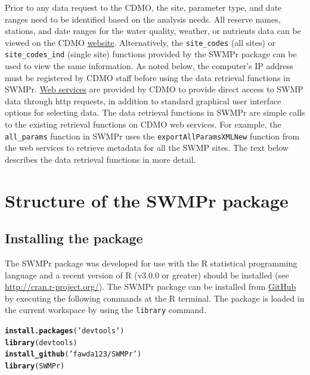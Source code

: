\documentclass[10pt,letterpaper]{article}\usepackage[]{graphicx}\usepackage[]{color}
\makeatletter
\newcommand{\hlstr}[1]{\textcolor[rgb]{0.192,0.494,0.8}{#1}}%
\newcommand{\hlstd}[1]{\textcolor[rgb]{0.345,0.345,0.345}{#1}}%
\newcommand{\hlkwd}[1]{\textcolor[rgb]{0.737,0.353,0.396}{\textbf{#1}}}%
\newenvironment{kframe}{%
 \def\at@end@of@kframe{}%
 \ifinner\ifhmode%
  \def\at@end@of@kframe{\end{minipage}}%
  \begin{minipage}{\columnwidth}%
 \fi\fi%
 \def\FrameCommand##1{\hskip\@totalleftmargin \hskip-\fboxsep
 \colorbox{shadecolor}{##1}\hskip-\fboxsep
     \hskip-\linewidth \hskip-\@totalleftmargin \hskip\columnwidth}%
 \MakeFramed {\advance\hsize-\width
   \@totalleftmargin\z@ \linewidth\hsize
   \@setminipage}}%
 {\par\unskip\endMakeFramed%
 \at@end@of@kframe}
\newenvironment{knitrout}{}{} %
\makeatother
\begin{document}
Prior to any data request to the \ac{CDMO}, the site, parameter type, and date ranges need to be identified based on the analysis needs.  All reserve names, stations, and date ranges for the water quality, weather, or nutrients data can be viewed on the \ac{CDMO} \href{http://cdmo.baruch.sc.edu/}{website}. Alternatively, the \texttt{site\_codes} (all sites) or \texttt{site\_codes\_ind} (single site) functions provided by the SWMPr package can be used to view the same information.  As noted below, the computer's IP address must be registered by \ac{CDMO} staff before using the data retrieval functions in SWMPr.  \href{http://cdmo.baruch.sc.edu/webservices.cfm}{Web services} are provided by \ac{CDMO} to provide direct access to \ac{SWMP} data through http requests, in addition to standard graphical user interface options for selecting data.  The data retrieval functions in SWMPr are simple calls to the existing retrieval functions on \ac{CDMO} web services.  For example, the \texttt{all\_params} function in SWMPr uses the \texttt{exportAllParamsXMLNew} function from the web services to retrieve metadata for all the \ac{SWMP} sites.  The text below describes the data retrieval functions in more detail.

\section*{Structure of the SWMPr package}

\subsection*{Installing the package}

The SWMPr package was developed for use with the R statistical programming language and a recent version of R (v3.0.0 or greater) should be installed (see \href{http://cran.r-project.org/}{http://cran.r-project.org/}). The SWMPr package can be installed from \href{https://github.com/fawda123/SWMPr}{GitHub} by executing the following commands at the R terminal.  The package is loaded in the current workspace by using the \texttt{library} command.

\begin{knitrout}
\color{fgcolor}\begin{kframe}
\begin{alltt}
\hlkwd{install.packages}\hlstd{(}\hlstr{'devtools'}\hlstd{)}
\hlkwd{library}\hlstd{(devtools)}
\hlkwd{install_github}\hlstd{(}\hlstr{'fawda123/SWMPr'}\hlstd{)}
\hlkwd{library}\hlstd{(SWMPr)}
\end{alltt}
\end{kframe}
\end{knitrout}
\end{document}
